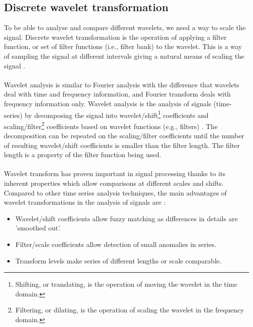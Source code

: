 \subsection{Discrete wavelet transformation}
To be able to analyse and compare different wavelets, we need a way to scale
the signal. Discrete wavelet transformation is the operation of applying a
filter function, or set of filter functions (i.e., filter bank) to the wavelet.
This is a way of sampling the signal at different intervals giving a natural
means of scaling the signal \cite{karus2013}.

\paragraph{}
Wavelet analysis is similar to Fourier analysis with the difference that
wavelets deal with time and frequency information, and Fourier transform deals
with frequency information only. Wavelet analysis is the analysis of signals
(time-series) by decomposing the signal into wavelet/shift\footnote{Shifting,
or translating, is the operation of moving the wavelet in the time domain.}
coefficients and scaling/filter\footnote{Filtering, or dilating, is the
operation of scaling the wavelet in the frequency domain.} coefficients based
on wavelet functions (e.g., filters) \cite{karus2013}. The decomposition can be
repeated on the scaling/filter coefficients until the number of resulting
wavelet/shift coefficients is smaller than the filter length. The filter length
is a property of the filter function being used.

\paragraph{}
Wavelet transform has proven important in signal processing thanks to its
inherent properties which allow comparisons at different scales and shifts.
Compared to other time series analysis techniques, the main advantages of
wavelet transformations in the analysis of signals are \cite{karus2013}:
\begin{itemize}
	\item Wavelet/shift coefficients allow fuzzy matching as differences in details
	are 'smoothed out'.
	\item Filter/scale coefficients allow detection of small anomalies in series.
	\item Transform levels make series of different lengths or scale comparable.
\end{itemize}

